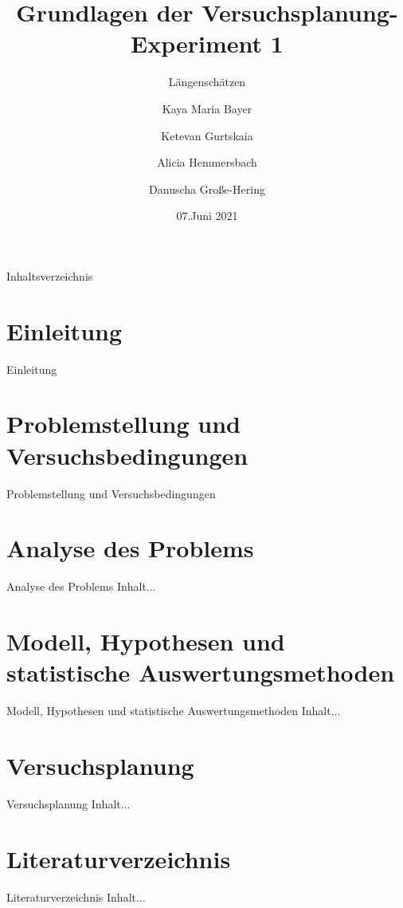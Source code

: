 \documentclass[ ngerman, fontsize= 12pt, headings=big, titlepage=true]{beamer}
\title{Grundlagen der Versuchsplanung-Experiment 1}
\subtitle{Längenschätzen}
\author{Kaya Maria Bayer \and Ketevan Gurtskaia \and Alicia Hemmersbach \and Danuscha Große-Hering}
\date{07.Juni 2021}
\begin{document}
\begin{frame}[plain]
    \maketitle
\end{frame}

\begin{frame}{Inhaltsverzeichnis}
	\tableofcontents
\end{frame}

\section{Einleitung}
\begin{frame}{Einleitung}
\end{frame}

\section{Problemstellung und Versuchsbedingungen}
\begin{frame}{Problemstellung und Versuchsbedingungen}
	
\end{frame}

\section{Analyse des Problems}
\begin{frame}{Analyse des Problems}
	Inhalt...
\end{frame}

\section{Modell, Hypothesen und statistische Auswertungsmethoden}
\begin{frame}{Modell, Hypothesen und statistische Auswertungsmethoden}
	Inhalt...
\end{frame}

\section{Versuchsplanung}
\begin{frame}{Versuchsplanung}
	Inhalt...
\end{frame}

\section{Literaturverzeichnis}
\begin{frame}{Literaturverzeichnis}
	Inhalt...
\end{frame}
\end{document}
